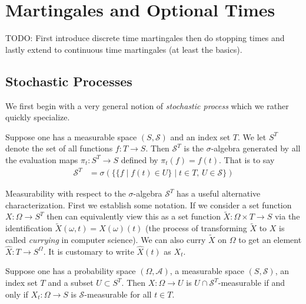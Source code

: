 \chapter{Martingales and Optional Times}
TODO:  First introduce discrete time martingales then do stopping
times and lastly extend to continuous time martingales (at least the
basics).

\section{Stochastic Processes}

We first begin with a very general notion of \emph{stochastic process}
which we rather quickly specialize.  
\begin{defn}Suppose one has a measurable space $(S, \mathcal{S})$ and an
  index set $T$.  We let $S^T$ denote the set of all functions $f : T
  \to S$.  Then $\mathcal{S}^T$ is the $\sigma$-algebra generated by
  all the evaluation maps $\pi_t : S^T \to S$ defined by $\pi_t(f) =
  f(t)$.  That is to say
\begin{align*}
\mathcal{S}^T &= \sigma \left ( \lbrace \lbrace f \mid f(t) \in U
  \rbrace \mid t \in T \text{, } U \in
  \mathcal{S} \rbrace\right )
\end{align*}
\end{defn}
Measurability with respect to the $\sigma$-algebra $\mathcal{S}^T$ has a useful
alternative characterization.  First we establish some notation.  If
we consider a set function $X : \Omega \to S^T$ then can equivalently
view this as a set function $\tilde{X} : \Omega \times T \to S$ via the
identification $\tilde{X}(\omega, t) = X(\omega)(t)$ (the process of
transforming $\tilde{X}$ to $X$  is called
\emph{currying} in computer science).  We can also curry $\tilde{X}$ on $\Omega$
 to get an element $\hat{X} : T \to S^\Omega$.  It is customary to
write $\hat{X}(t)$ as $X_t$.
\begin{lem}\label{ProcessMeasurableProjections}Suppose one has a probability space $(\Omega,
  \mathcal{A})$, a measurable space $(S, \mathcal{S})$, an
  index set $T$ and a subset $U \subset S^T$.  Then $X : \Omega \to U$
  is $U \cap \mathcal{S}^T$-measurable if and only if $X_t : \Omega
  \to S$ is $\mathcal{S}$-measurable for all $t \in T$.
\end{lem}
